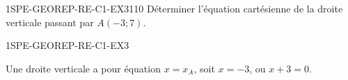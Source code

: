 \begin{exercice}{1SPE-GEOREP-RE-C1-EX3}{1}{10}
Déterminer l'équation cartésienne de la droite verticale passant par $A(-3 ; 7)$.
\end{exercice}


\begin{corrige}{1SPE-GEOREP-RE-C1-EX3}

Une droite verticale a pour équation $x = x_A$, soit $x = -3$, ou $x + 3 = 0$.

\end{corrige}
